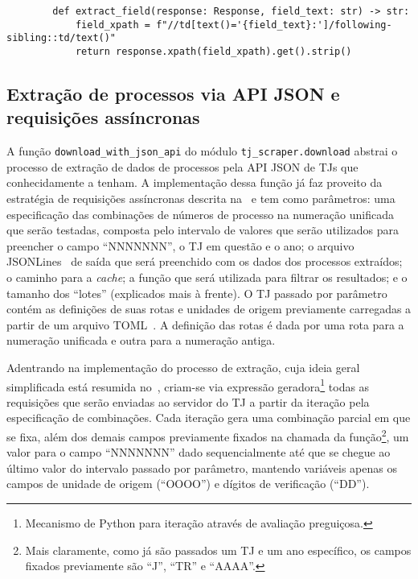 
\begin{listing}[htb]
    \centering{}
    \begin{verbatim}
        def extract_field(response: Response, field_text: str) -> str:
            field_xpath = f"//td[text()='{field_text}:']/following-sibling::td/text()"
            return response.xpath(field_xpath).get().strip()
    \end{verbatim}
    \caption{%
        Código da função responsável pela extração de um campo em uma resposta
        de uma requisição a uma página de visualização de processo.
    }
    \label{cod:extract_field}
\end{listing}

\subsection{Extração de processos via API JSON e requisições assíncronas}

A função \texttt{download_with_json_api} do módulo
\texttt{tj\_scraper.download} abstrai o processo de extração de dados de
processos pela API JSON de TJs que conhecidamente a tenham. A implementação
dessa função já faz proveito da estratégia de requisições assíncronas descrita
na~ e tem como parâmetros: uma especificação
das combinações de números de processo na numeração unificada que serão
testadas, composta pelo intervalo de valores que serão utilizados para
preencher o campo ``NNNNNNN'', o TJ em questão e o ano; o arquivo
JSONLines~\cite{spec:jsonlines} de saída que será preenchido com os dados dos
processos extraídos; o caminho para a \textit{cache}; a função que será
utilizada para filtrar os resultados; e o tamanho dos ``lotes'' (explicados
mais à frente). O TJ passado por parâmetro contém as definições de suas rotas e
unidades de origem previamente carregadas a partir de um arquivo
TOML~\cite{spec:toml}. A definição das rotas é dada por uma rota para a
numeração unificada e outra para a numeração antiga.

Adentrando na implementação do processo de extração, cuja ideia geral
simplificada está resumida no~, criam-se via
expressão geradora\footnote{Mecanismo de Python para iteração através de
avaliação preguiçosa.} todas as requisições que serão enviadas ao servidor do
TJ a partir da iteração pela especificação de combinações. Cada iteração gera
uma combinação parcial em que se fixa, além dos demais campos previamente
fixados na chamada da função\footnote{Mais claramente, como já são passados um
TJ e um ano específico, os campos fixados previamente são ``J'', ``TR'' e
``AAAA''.}, um valor para o campo ``NNNNNNN'' dado sequencialmente até que se
chegue ao último valor do intervalo passado por parâmetro, mantendo variáveis
apenas os campos de unidade de origem (``OOOO'') e dígitos de verificação
(``DD'').

